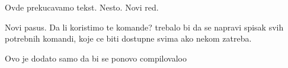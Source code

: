 Ovde prekucavamo tekst. Nesto.
Novi red.

Novi pasus. Da li koristimo te komande?
trebalo bi da se napravi spisak svih potrebnih komandi, koje ce biti dostupne svima ako nekom zatreba.

Ovo je dodato samo da bi se ponovo compilovaloo


